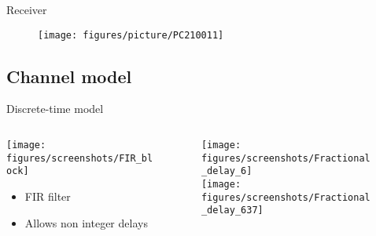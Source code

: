 \documentclass[xetex, onlymath, handout]{beamer}
\begin{document}
\begin{frame}{Receiver}
  \begin{figure}
    \centering
    \texttt{[image: figures/picture/PC210011]}
  \end{figure}
\end{frame}



\subsection{Channel model}

\begin{frame}{Discrete-time model}
\begin{columns}
	\begin{column}{.4\linewidth}
		\texttt{[image: figures/screenshots/FIR\_block]}
		\vspace{1cm}
		\begin{itemize}
			\item FIR filter
			\item Allows non integer delays
		\end{itemize}
	\end{column}
	\begin{column}{.6\linewidth}
		\begin{figure}
			\centering
			\texttt{[image: figures/screenshots/Fractional\_delay\_6]}\\
			\texttt{[image: figures/screenshots/Fractional\_delay\_637]}
		\end{figure}
	\end{column}
\end{columns}
\end{frame}
\end{document}

